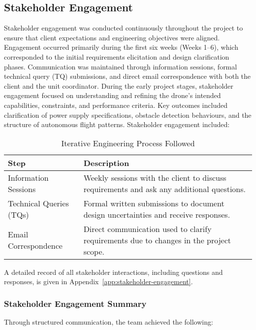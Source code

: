 \subsection{Stakeholder Engagement}
Stakeholder engagement was conducted continuously throughout the project to ensure that client expectations and engineering objectives were aligned. Engagement occurred primarily during the first six weeks (Weeks 1–6), which corresponded to the initial requirements elicitation and design clarification phases. Communication was maintained through information sessions, formal technical query (TQ) submissions, and direct email correspondence with both the client and the unit coordinator. During the early project stages, stakeholder engagement focused on understanding and refining the drone’s intended capabilities, constraints, and performance criteria. Key outcomes included clarification of power supply specifications, obstacle detection behaviours, and the structure of autonomous flight patterns. Stakeholder engagement included:

\begin{table}[H]
\centering
\caption{Iterative Engineering Process Followed}
\begin{tabular}{|p{3cm}|p{10cm}|}
\hline
\textbf{Step} & \textbf{Description} \\ \hline
Information Sessions & Weekly sessions with the client to discuss requirements and ask any additional questions. \\ \hline
Technical Queries (TQs) & Formal written submissions to document design uncertainties and receive responses. \\ \hline
Email Correspondence & Direct communication used to clarify requirements due to changes in the project scope. \\ \hline
\end{tabular}
\end{table}

A detailed record of all stakeholder interactions, including questions and responses, is given in Appendix~\ref{app:stakeholder-engagement}.

\subsubsection{Stakeholder Engagement Summary} \leavevmode

Through structured communication, the team achieved the following: \

